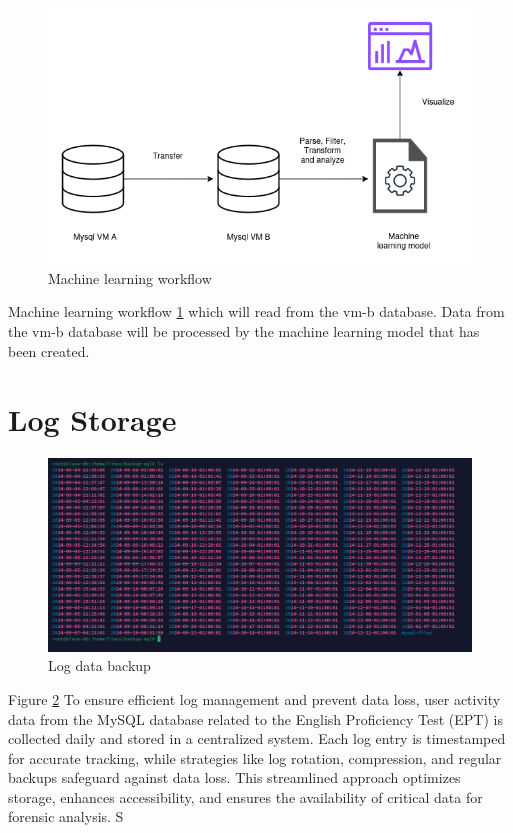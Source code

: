 \begin{figure}[H] 
    \centering
    \includegraphics[width=14cm]{figure/ml-workflow.png}
    \caption{Machine learning workflow}
    \label{fig:mlops}
\end{figure}

Machine learning workflow \ref{fig:mlops} which will read from the vm-b database. Data from the vm-b database will be processed by the machine learning model that has been created.
\section{Log Storage}
\begin{figure}[H] 
    \centering
    \includegraphics[width=14cm]{figure/log-backup-sql.png}
    \caption{Log data backup}
    \label{fig:logs-backup-linux}
\end{figure}

Figure \ref{fig:logs-backup-linux} To ensure efficient log management and prevent data loss, user activity data from the MySQL database related to the English Proficiency Test (EPT) is collected daily and stored in a centralized system. Each log entry is timestamped for accurate tracking, while strategies like log rotation, compression, and regular backups safeguard against data loss. This streamlined approach optimizes storage, enhances accessibility, and ensures the availability of critical data for forensic analysis.
S

